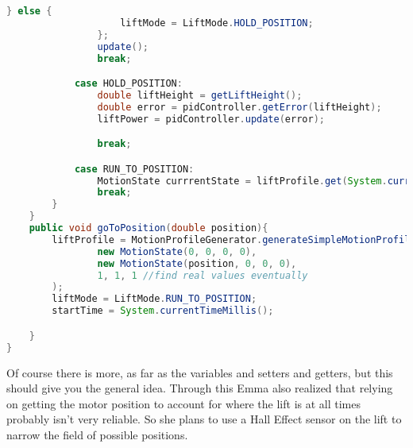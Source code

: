 \documentclass{article}
\begin{document}
\begin{lstlisting}[language=Java]
                } else {
                    liftMode = LiftMode.HOLD_POSITION;
                };
                update();
                break;

            case HOLD_POSITION:
                double liftHeight = getLiftHeight();
                double error = pidController.getError(liftHeight);
                liftPower = pidController.update(error);

                break;

            case RUN_TO_POSITION:
                MotionState currrentState = liftProfile.get(System.currentTimeMillis() - startTime);
                break;
        }
    }
    public void goToPosition(double position){
        liftProfile = MotionProfileGenerator.generateSimpleMotionProfile(
                new MotionState(0, 0, 0, 0),
                new MotionState(position, 0, 0, 0),
                1, 1, 1 //find real values eventually
        );
        liftMode = LiftMode.RUN_TO_POSITION;
        startTime = System.currentTimeMillis();

    }
}
\end{lstlisting}
Of course there is more, as far as the variables and setters and getters, but this should give you the general idea. Through this Emma also realized that relying on getting the motor position to account for where the lift is at all times probably isn't very reliable. So she plans to use a Hall Effect sensor on the lift to narrow the field of possible positions.
\end{document}
